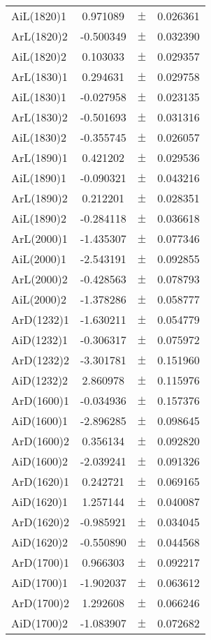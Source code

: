 \begin{table}
\begin{tiny}
\begin{tabular}{lccc}
AiL(1820)1 & 0.971089 & $\pm$ & 0.026361 \\
ArL(1820)2 & -0.500349 & $\pm$ & 0.032390 \\
AiL(1820)2 & 0.103033 & $\pm$ & 0.029357 \\
ArL(1830)1 & 0.294631 & $\pm$ & 0.029758 \\
AiL(1830)1 & -0.027958 & $\pm$ & 0.023135 \\
ArL(1830)2 & -0.501693 & $\pm$ & 0.031316 \\
AiL(1830)2 & -0.355745 & $\pm$ & 0.026057 \\
ArL(1890)1 & 0.421202 & $\pm$ & 0.029536 \\
AiL(1890)1 & -0.090321 & $\pm$ & 0.043216 \\
ArL(1890)2 & 0.212201 & $\pm$ & 0.028351 \\
AiL(1890)2 & -0.284118 & $\pm$ & 0.036618 \\
ArL(2000)1 & -1.435307 & $\pm$ & 0.077346 \\
AiL(2000)1 & -2.543191 & $\pm$ & 0.092855 \\
ArL(2000)2 & -0.428563 & $\pm$ & 0.078793 \\
AiL(2000)2 & -1.378286 & $\pm$ & 0.058777 \\
ArD(1232)1 & -1.630211 & $\pm$ & 0.054779 \\
AiD(1232)1 & -0.306317 & $\pm$ & 0.075972 \\
ArD(1232)2 & -3.301781 & $\pm$ & 0.151960 \\
AiD(1232)2 & 2.860978 & $\pm$ & 0.115976 \\
ArD(1600)1 & -0.034936 & $\pm$ & 0.157376 \\
AiD(1600)1 & -2.896285 & $\pm$ & 0.098645 \\
ArD(1600)2 & 0.356134 & $\pm$ & 0.092820 \\
AiD(1600)2 & -2.039241 & $\pm$ & 0.091326 \\
ArD(1620)1 & 0.242721 & $\pm$ & 0.069165 \\
AiD(1620)1 & 1.257144 & $\pm$ & 0.040087 \\
ArD(1620)2 & -0.985921 & $\pm$ & 0.034045 \\
AiD(1620)2 & -0.550890 & $\pm$ & 0.044568 \\
ArD(1700)1 & 0.966303 & $\pm$ & 0.092217 \\
AiD(1700)1 & -1.902037 & $\pm$ & 0.063612 \\
ArD(1700)2 & 1.292608 & $\pm$ & 0.066246 \\
AiD(1700)2 & -1.083907 & $\pm$ & 0.072682 \\
\bottomrule
\end{tabular}
\end{tiny}
\end{table}

